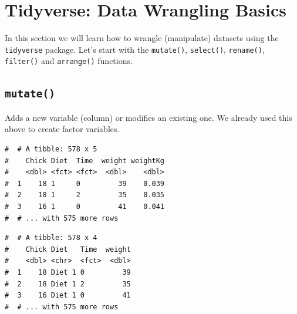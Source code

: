 \documentclass[a4paper,9pt,twocolumn,twoside,printwatermark=false]{pinp}
\begin{document}
\section{Tidyverse: Data Wrangling
Basics}\label{tidyverse-data-wrangling-basics}

In this section we will learn how to wrangle (manipulate) datasets using
the \texttt{tidyverse} package. Let's start with the \texttt{mutate()},
\texttt{select()}, \texttt{rename()}, \texttt{filter()} and
\texttt{arrange()} functions.

\subsection{\texorpdfstring{\texttt{mutate()}}{mutate()}}\label{mutate}

Adds a new variable (column) or modifies an existing one. We already
used this above to create factor variables.

\begin{Shaded}
\begin{Highlighting}[]
\StringTok{ }\OperatorTok{/}\NormalTok{)}
\end{Highlighting}
\end{Shaded}

\begin{ShadedResult}
\begin{verbatim}
#  # A tibble: 578 x 5
#    Chick Diet  Time  weight weightKg
#    <dbl> <fct> <fct>  <dbl>    <dbl>
#  1    18 1     0         39    0.039
#  2    18 1     2         35    0.035
#  3    16 1     0         41    0.041
#  # ... with 575 more rows
\end{verbatim}
\end{ShadedResult}

\begin{Shaded}
\begin{Highlighting}[]
\StringTok{ } \NormalTok{(}
\end{Highlighting}
\end{Shaded}

\begin{ShadedResult}
\begin{verbatim}
#  # A tibble: 578 x 4
#    Chick Diet   Time  weight
#    <dbl> <chr>  <fct>  <dbl>
#  1    18 Diet 1 0         39
#  2    18 Diet 1 2         35
#  3    16 Diet 1 0         41
#  # ... with 575 more rows
\end{verbatim}
\end{ShadedResult}
\end{document}
